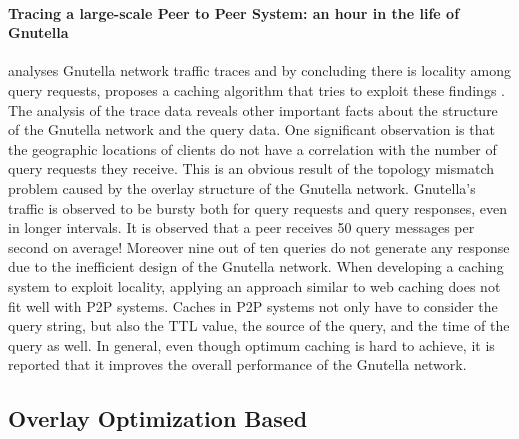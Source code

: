 \paragraph*{\bf Tracing a large-scale Peer to Peer System: an hour in the life
of Gnutella}
\cite{Markatos02} analyses Gnutella network traffic traces and by concluding
there is locality among query requests, proposes a caching algorithm that tries
to exploit these findings . The analysis of the trace data reveals other
important facts about the structure of the Gnutella network and the query data.
One significant observation is that the geographic locations of clients do not
have a correlation with the number of query requests they receive. This is an
obvious result of the topology mismatch problem caused by the overlay structure
of the Gnutella network. Gnutella's traffic is observed to be bursty both for
query requests and query responses, even in longer intervals. It is observed
that a peer receives 50 query messages per second on average! Moreover nine out
of ten queries do not generate any response due to the inefficient design of
the Gnutella network. When developing a caching system to exploit locality,
applying an approach similar to web caching does not fit well with P2P systems.
Caches in P2P systems not only have to consider the query string, but also
the TTL value, the source of the query, and the time of the query as well.  In
general, even though optimum caching is hard to achieve, it is reported that
it improves the overall performance of the Gnutella network.

\subsection{Overlay Optimization Based}

%
%
%
%

